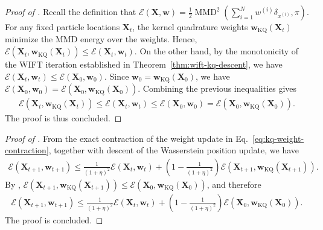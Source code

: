 \begin{proof}[Proof of ]
Recall the definition that $\mathcal{E}(\bm{X},\bm{w})
=\frac12\operatorname{MMD}^2\left(\sum_{i=1}^N w^{(i)}\delta_{x^{(i)}},\pi\right)$. For any fixed particle locations $\bm{X}_t$, the kernel quadrature weights
$\bm{w}_{\mathrm{KQ}}(\bm{X}_t)$ minimize the MMD energy over the weights. Hence, $\mathcal{E}\left(
\bm{X}_t,
\bm{w}_{\mathrm{KQ}}(\bm{X}_t)
\right)
\leq
\mathcal{E}\left(
\bm{X}_t,
\bm{w}_t
\right)$. On the other hand, by the monotonicity of the WIFT iteration established in
Theorem~\ref{thm:wift-kq-descent}, we have $\mathcal{E}\left(
\bm{X}_t,
\bm{w}_t
\right)
\leq
\mathcal{E}\left(
\bm{X}_0,
\bm{w}_0
\right)$. Since $\bm{w}_0=\bm{w}_{\mathrm{KQ}}(\bm{X}_0)$, we have
$ \mathcal{E}(\bm{X}_0,\bm{w}_0)
=
\mathcal{E}(\bm{X}_0,\bm{w}_{\mathrm{KQ}}(\bm{X}_0)) $.
Combining the previous inequalities gives
\begin{align}
\mathcal{E}\left(
\bm{X}_t,
\bm{w}_{\mathrm{KQ}}(\bm{X}_t)
\right) \leq
\mathcal{E}\left(
\bm{X}_t,
\bm{w}_t
\right) \leq
\mathcal{E}\left(
\bm{X}_0,
\bm{w}_0
\right) = \mathcal{E}\left(
\bm{X}_0,
\bm{w}_{\mathrm{KQ}}(\bm{X}_0)
\right).
\end{align}
The proof is thus concluded. 
\end{proof}

\begin{proof}[Proof of ]
From the exact contraction of the weight update in
Eq.~\eqref{eq:kq-weight-contraction}, together with descent of the Wasserstein position update, we have
\begin{align}
\mathcal{E}(\bm{X}_{t+1},\bm{w}_{t+1}) \leq \frac{1}{(1+\eta)^2}
\mathcal{E}(\bm{X}_t,\bm{w}_t) + \left(
1 - \frac{1}{(1+\eta)^2}
\right)
\mathcal{E} \left(
\bm{X}_{t+1},
\bm{w}_{\mathrm{KQ}}(\bm{X}_{t+1}) \right).
\label{eq:wift-one-step-convergence}
\end{align}
By , 
$\mathcal{E}(\bm{X}_{t+1},\bm{w}_{\mathrm{KQ}}(\bm{X}_{t+1}))
\leq
\mathcal{E}(\bm{X}_0,\bm{w}_{\mathrm{KQ}}(\bm{X}_0))$,
and therefore
\begin{align}
\mathcal{E}(\bm{X}_{t+1},\bm{w}_{t+1}) \leq
\frac{1}{(1+\eta)^2}
\mathcal{E}(\bm{X}_t,\bm{w}_t) +
\left(
1-\frac{1}{(1+\eta)^2}
\right)
\mathcal{E}\left(
\bm{X}_0,
\bm{w}_{\mathrm{KQ}}(\bm{X}_0)
\right).
\label{eq:wift-recursion-initial-kq}
\end{align}
The proof is concluded. 
\end{proof}
